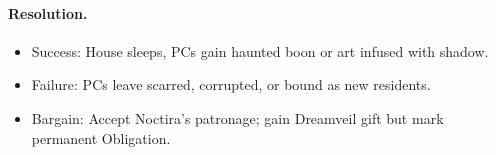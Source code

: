 \documentclass[11pt]{article}
\begin{document}
\paragraph{Resolution.}
\begin{itemize}
  \item Success: House sleeps, PCs gain haunted boon or art infused with shadow.
  \item Failure: PCs leave scarred, corrupted, or bound as new residents.
  \item Bargain: Accept Noctira's patronage; gain Dreamveil gift but mark permanent Obligation.
\end{itemize}
\end{document}
